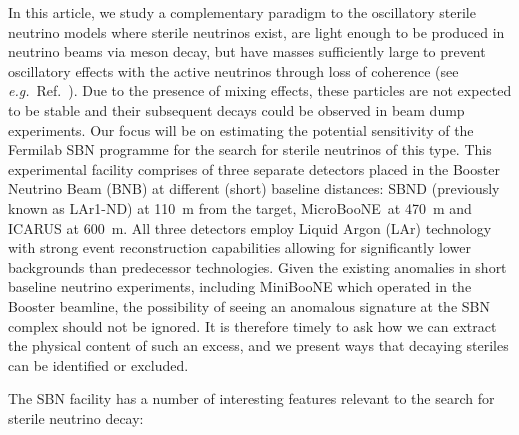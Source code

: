 \documentclass[11pt, a4paper]{article}
\newcommand{\refref}[1]{Ref.~\cite{#1}}
\def\eg{\emph{e.g.}}
\def\muboone{MicroBooNE}
\begin{document}
In this article, we study a complementary paradigm to the oscillatory sterile
neutrino models where sterile neutrinos exist, are light enough to be produced
in neutrino beams via meson decay, but have masses sufficiently large to
prevent oscillatory effects with the active neutrinos through loss of coherence
(see \eg\ \refref{Akhmedov:2009rb}). Due to the presence of mixing effects,
these particles are not expected to be stable and their subsequent decays could
be observed in beam dump experiments. 
%
%
Our focus will be on estimating the potential sensitivity of the Fermilab SBN
programme \cite{Antonello:2015lea} for the search for sterile neutrinos of this
type. 
%
This experimental facility comprises of three separate detectors placed in the
Booster Neutrino Beam (BNB) at different (short) baseline distances: SBND
(previously known as LAr1-ND) at 110~m from the target, \muboone\ at 470~m and
ICARUS at 600~m.  All three detectors employ Liquid Argon (LAr) technology with
strong event reconstruction capabilities allowing for significantly lower
backgrounds than predecessor technologies. 
%
%
Given the existing anomalies in short baseline neutrino experiments, including
MiniBooNE which operated in the Booster beamline, the possibility of seeing an
anomalous signature at the SBN complex should not be ignored. It is therefore
timely to ask how we can extract the physical content of such an excess, and we
present ways that decaying steriles can be identified or excluded.

The SBN facility has a number of interesting features relevant to the search
for sterile neutrino decay:
\end{document}
